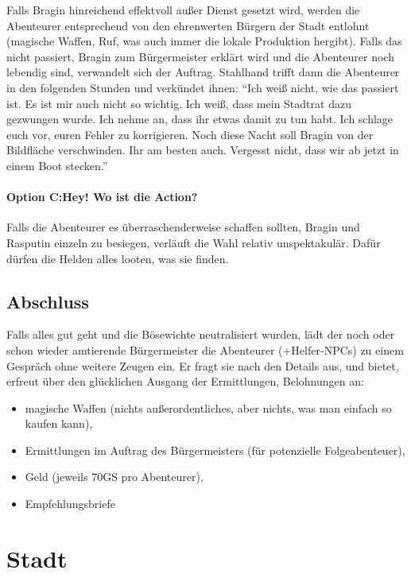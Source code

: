\documentclass[a4paper,10pt]{scrartcl}
\begin{document}
Falls Bragin hinreichend effektvoll außer Dienst gesetzt wird, werden
die Abenteurer entsprechend von den ehrenwerten Bürgern der Stadt
entlohnt (magische Waffen, Ruf, was auch immer die lokale Produktion
hergibt). Falls das nicht passiert, Bragin zum Bürgermeister erklärt
wird und die Abenteurer noch lebendig sind, verwandelt sich der Auftrag.
Stahlhand trifft dann die Abenteurer in den folgenden Stunden und
verkündet ihnen: "`Ich weiß nicht, wie das passiert ist. Es ist mir auch
nicht so wichtig. Ich weiß, dass mein Stadtrat dazu gezwungen wurde. Ich
nehme an, dass ihr etwas damit zu tun habt. Ich schlage euch vor, euren
Fehler zu korrigieren. Noch diese Nacht soll Bragin von der Bildfläche
verschwinden. Ihr am besten auch. Vergesst nicht, dass wir ab jetzt in
einem Boot stecken."'

\paragraph{Option C:\@ Hey! Wo ist die Action?}
Falls die Abenteurer es überraschenderweise schaffen sollten, Bragin und
Rasputin einzeln zu besiegen, verläuft die Wahl relativ unspektakulär.
Dafür dürfen die Helden alles looten, was sie finden.

\subsection{Abschluss}

Falls alles gut geht und die Bösewichte neutralisiert wurden, lädt der
noch oder schon wieder amtierende Bürgermeister die Abenteurer
(+Helfer-NPCs) zu einem Gespräch ohne weitere Zeugen ein. Er fragt sie
nach den Details aus, und bietet, erfreut über den glücklichen Ausgang
der Ermittlungen, Belohnungen an:
\begin{itemize}
  \item magische Waffen (nichts außerordentliches, aber nichts, was man
    einfach so kaufen kann),
  \item Ermittlungen im Auftrag des Bürgermeisters (für potenzielle
    Folgeabenteuer),
  \item Geld (jeweils 70GS pro Abenteurer),
  \item Empfehlungsbriefe
\end{itemize}

\section{Stadt}
\end{document}
